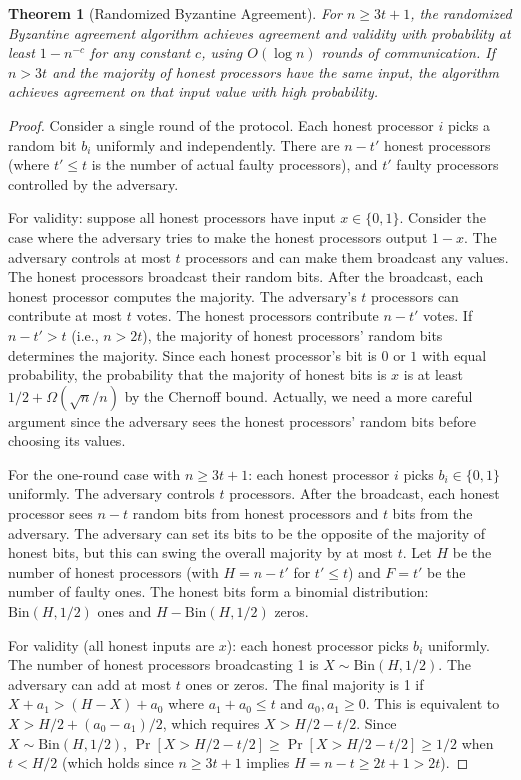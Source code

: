 \documentclass[twoside,12pt]{book}
\theoremstyle{plain}
\newtheorem{theorem}{Theorem}[chapter]
\theoremstyle{definition}
\theoremstyle{remark}
\begin{document}
\begin{theorem}[Randomized Byzantine Agreement]
\label{thm:random-byzantine}
For $n \geq 3t + 1$, the randomized Byzantine agreement algorithm achieves agreement and validity with probability at least $1 - n^{-c}$ for any constant $c$, using $O(\log n)$ rounds of communication. If $n > 3t$ and the majority of honest processors have the same input, the algorithm achieves agreement on that input value with high probability.
\end{theorem}

\begin{proof}
Consider a single round of the protocol. Each honest processor $i$ picks a random bit $b_i$ uniformly and independently. There are $n - t'$ honest processors (where $t' \leq t$ is the number of actual faulty processors), and $t'$ faulty processors controlled by the adversary. 

For validity: suppose all honest processors have input $x \in \{0, 1\}$. Consider the case where the adversary tries to make the honest processors output $1 - x$. The adversary controls at most $t$ processors and can make them broadcast any values. The honest processors broadcast their random bits. After the broadcast, each honest processor computes the majority. The adversary's $t$ processors can contribute at most $t$ votes. The honest processors contribute $n - t'$ votes. If $n - t' > t$ (i.e., $n > 2t$), the majority of honest processors' random bits determines the majority. Since each honest processor's bit is $0$ or $1$ with equal probability, the probability that the majority of honest bits is $x$ is at least $1/2 + \Omega(\sqrt{n}/n)$ by the Chernoff bound. Actually, we need a more careful argument since the adversary sees the honest processors' random bits before choosing its values.

For the one-round case with $n \geq 3t + 1$: each honest processor $i$ picks $b_i \in \{0, 1\}$ uniformly. The adversary controls $t$ processors. After the broadcast, each honest processor sees $n - t$ random bits from honest processors and $t$ bits from the adversary. The adversary can set its bits to be the opposite of the majority of honest bits, but this can swing the overall majority by at most $t$. Let $H$ be the number of honest processors (with $H = n - t'$ for $t' \leq t$) and $F = t'$ be the number of faulty ones. The honest bits form a binomial distribution: $\text{Bin}(H, 1/2)$ ones and $H - \text{Bin}(H, 1/2)$ zeros.

For validity (all honest inputs are $x$): each honest processor picks $b_i$ uniformly. The number of honest processors broadcasting 1 is $X \sim \text{Bin}(H, 1/2)$. The adversary can add at most $t$ ones or zeros. The final majority is 1 if $X + a_1 > (H - X) + a_0$ where $a_1 + a_0 \leq t$ and $a_0, a_1 \geq 0$. This is equivalent to $X > H/2 + (a_0 - a_1)/2$, which requires $X > H/2 - t/2$. Since $X \sim \text{Bin}(H, 1/2)$, $\Pr[X > H/2 - t/2] \geq \Pr[X > H/2 - t/2] \geq 1/2$ when $t < H/2$ (which holds since $n \geq 3t + 1$ implies $H = n - t \geq 2t + 1 > 2t$).


\end{proof}
\end{document}
